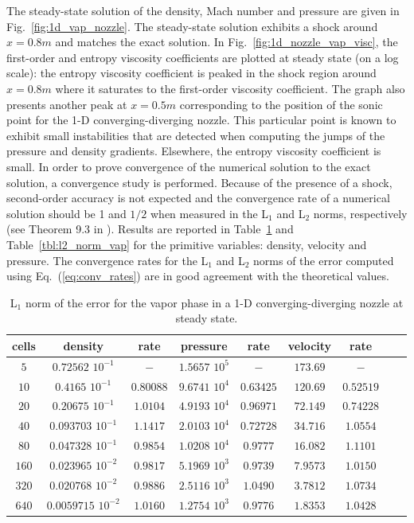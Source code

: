 \documentclass[preprint,10pt]{elsarticle}
\newcommand{\eqt}[1]{Eq.~(\ref{#1})}                     %
\newcommand{\fig}[1]{Fig.~\ref{#1}}                      %
\newcommand{\tbl}[1]{Table~\ref{#1}}                     %
\begin{document}
%
The steady-state solution of the density, Mach number and pressure are given in \fig{fig:1d_vap_nozzle}. 
The steady-state solution exhibits a shock around $x=0.8m$ and matches the exact solution. In \fig{fig:1d_nozzle_vap_visc}, 
the first-order and entropy viscosity coefficients are plotted at steady state (on a log scale): the entropy viscosity 
coefficient is peaked in the shock region around $x=0.8m$ where it saturates to the first-order viscosity 
coefficient. The graph also presents another peak at $x=0.5m$  corresponding to the position of the sonic point for the 
1-D converging-diverging nozzle. This particular point is known to exhibit small instabilities that are detected when 
computing the jumps of the pressure and density gradients. Elsewhere, the entropy  viscosity coefficient is small. 
In order to prove convergence of the numerical solution to the exact solution, a convergence study is performed. Because 
of the presence of a shock, second-order accuracy is not expected and the convergence rate of a numerical solution 
should be 1 and $1/2$ when measured in the L$_1$ and L$_2$ norms, respectively (see Theorem 9.3 in \cite{convergence_book}). 
Results are reported in \tbl{tbl:l1_norm_vap} and \tbl{tbl:l2_norm_vap} for the primitive variables: density, 
velocity and pressure. The convergence rates for the L$_1$ and L$_2$ norms of the error computed using \eqt{eq:conv_rates} 
are in good agreement with the theoretical values.
%
\begin{table}[!htbp]
\begin{center}
 \caption{\label{tbl:l1_norm_vap} L$_1$ norm of the error for the vapor phase in a 1-D converging-diverging nozzle at steady state.}
 \begin{tabular}{|c|c|c|c|c|c|c|c|c|}
 \hline
cells & density              & rate      & pressure          & rate      & velocity & rate      \\ \hline
$5$  & $0.72562$   $10^{-1}$ & $-$       & $1.5657$ $10^{5}$ & $-$       & $173.69$ & $-$       \\ \hline
$10$ & $0.4165$    $10^{-1}$ & $0.80088$ & $9.6741$ $10^{4}$ & $0.63425$ & $120.69$ & $0.52519$ \\ \hline
$20$ & $0.20675$   $10^{-1}$ & $1.0104$  & $4.9193$ $10^{4}$ & $0.96971$ & $72.149$ & $0.74228$ \\ \hline
$40$ & $0.093703$  $10^{-1}$ & $1.1417$  & $2.0103$ $10^{4}$ & $0.72728$ & $34.716$ & $1.0554$  \\ \hline
$80$ & $0.047328$  $10^{-1}$ & $0.9854$  & $1.0208$ $10^{4}$ & $0.9777$  & $16.082$ & $1.1101$  \\ \hline
$160$& $0.023965$  $10^{-2}$ & $0.9817$  & $5.1969$ $10^{3}$ & $0.9739$  & $7.9573$ & $1.0150$  \\ \hline
$320$& $0.020768$  $10^{-2}$ & $0.9886$  & $2.5116$ $10^{3}$ & $1.0490$  & $3.7812$ & $1.0734$  \\ \hline
$640$& $0.0059715$ $10^{-2}$ & $1.0160$  & $1.2754$ $10^{3}$ & $0.9776$  & $1.8353$ & $1.0428$  \\ \hline
\end{tabular}
\end{center}
\nonumber
\end{table}
\end{document}
